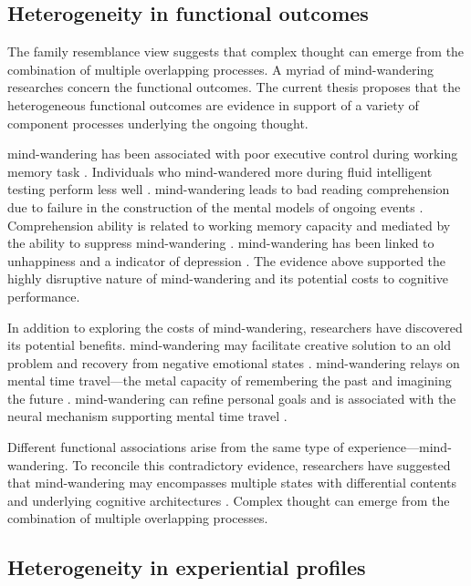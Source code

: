 \subsection{Heterogeneity in functional outcomes}

The family resemblance view suggests that complex thought can emerge from the combination of multiple overlapping processes. A myriad of mind-wandering researches concern the functional outcomes. The current thesis proposes that the heterogeneous functional outcomes are evidence in support of a variety of component processes underlying the ongoing thought. 

mind-wandering has been associated with poor executive control during working memory task \cite{McVayJOEP2009}. Individuals who mind-wandered more during fluid intelligent testing perform less well \cite{MrazekJoEP2012}. mind-wandering leads to bad reading comprehension due to failure in the construction of the mental models of ongoing events \cite{Smallwood2008}. Comprehension ability is related to working memory capacity and mediated by the ability to suppress mind-wandering \cite{McVayReading2012, Unsworth2013}. mind-wandering has been linked to unhappiness \cite{Killingsworth2010} and a indicator of depression \cite{Smallwood2007}. The evidence above supported the highly disruptive nature of mind-wandering and its potential costs to cognitive performance.

In addition to exploring the costs of mind-wandering, researchers have discovered its potential benefits. mind-wandering may facilitate creative solution to an old problem \cite{Baird2012, Smeekens2016} and recovery from negative emotional states \cite{RubyPlos2013, PoerioFrontiers2016}. mind-wandering relays on mental time travel---the metal capacity of remembering the past and imagining the future \cite{Stawarczyk2015}.  mind-wandering can refine personal goals \cite{Medea2016} and is associated with the neural mechanism supporting mental time travel \cite{DArgembeau2006,DArgembeau2015}. 

Different functional associations arise from the same type of experience---mind-wandering. To reconcile this contradictory evidence, researchers have suggested that mind-wandering may encompasses multiple states with differential contents and underlying cognitive architectures \cite{SmallwoodFrontiers2013}. Complex thought can emerge from the combination of multiple overlapping processes. 

\subsection{Heterogeneity in experiential profiles}

